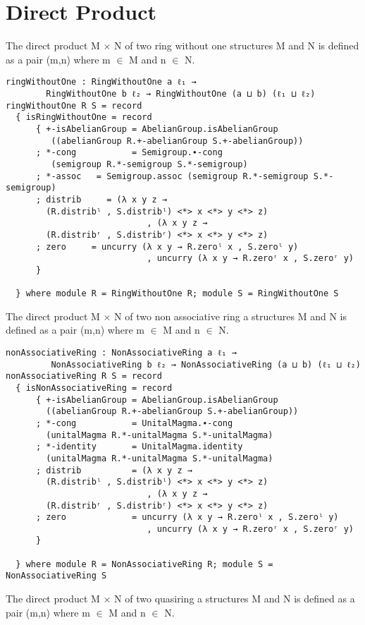 \section{Direct Product}
The direct product M \(\times\) N of two ring without one structures M and N is defined as a pair (m,n) where m \(\in\) M and n \(\in\) N.
\begin{Verbatim}
ringWithoutOne : RingWithoutOne a ℓ₁ → 
		RingWithoutOne b ℓ₂ → RingWithoutOne (a ⊔ b) (ℓ₁ ⊔ ℓ₂)
ringWithoutOne R S = record
  { isRingWithoutOne = record
      { +-isAbelianGroup = AbelianGroup.isAbelianGroup
		 ((abelianGroup R.+-abelianGroup S.+-abelianGroup))
      ; *-cong           = Semigroup.∙-cong
		 (semigroup R.*-semigroup S.*-semigroup)
      ; *-assoc   = Semigroup.assoc (semigroup R.*-semigroup S.*-semigroup)
      ; distrib     = (λ x y z → 
		(R.distribˡ , S.distribˡ) <*> x <*> y <*> z)
                            , (λ x y z → 
		(R.distribʳ , S.distribʳ) <*> x <*> y <*> z)
      ; zero     = uncurry (λ x y → R.zeroˡ x , S.zeroˡ y)
                            , uncurry (λ x y → R.zeroʳ x , S.zeroʳ y)
      }

  } where module R = RingWithoutOne R; module S = RingWithoutOne S
\end{Verbatim}
The direct product M \(\times\) N of two non associative ring a structures M and N is defined as a pair (m,n) where m \(\in\) M and n \(\in\) N.
\begin{Verbatim}
nonAssociativeRing : NonAssociativeRing a ℓ₁ →
		 NonAssociativeRing b ℓ₂ → NonAssociativeRing (a ⊔ b) (ℓ₁ ⊔ ℓ₂)
nonAssociativeRing R S = record
  { isNonAssociativeRing = record
      { +-isAbelianGroup = AbelianGroup.isAbelianGroup 
		((abelianGroup R.+-abelianGroup S.+-abelianGroup))
      ; *-cong           = UnitalMagma.∙-cong 
		(unitalMagma R.*-unitalMagma S.*-unitalMagma)
      ; *-identity       = UnitalMagma.identity 
		(unitalMagma R.*-unitalMagma S.*-unitalMagma)
      ; distrib          = (λ x y z → 
		(R.distribˡ , S.distribˡ) <*> x <*> y <*> z)
                            , (λ x y z → 
		(R.distribʳ , S.distribʳ) <*> x <*> y <*> z)
      ; zero             = uncurry (λ x y → R.zeroˡ x , S.zeroˡ y)
                            , uncurry (λ x y → R.zeroʳ x , S.zeroʳ y)
      }

  } where module R = NonAssociativeRing R; module S = NonAssociativeRing S
\end{Verbatim}
The direct product M \(\times\) N of two quasiring a structures M and N is defined as a pair (m,n) where m \(\in\) M and n \(\in\) N.
